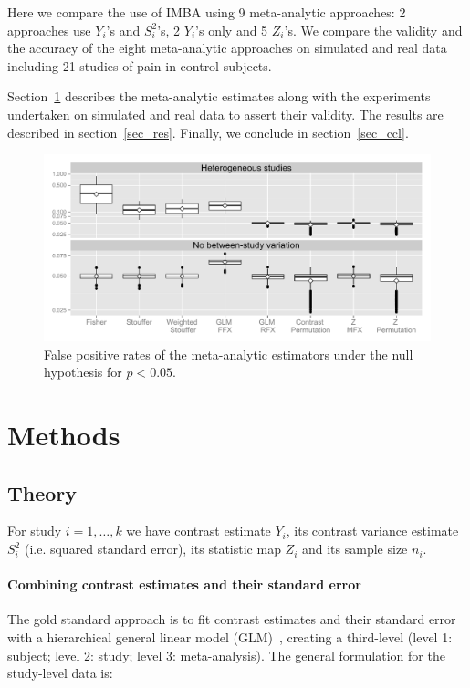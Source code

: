 \documentclass{llncs}
\newcommand{\effectvector}{Y}
\newcommand{\effect}[1][i]{\effectvector_{#1}}
\newcommand{\vareffect}[1][i]{S^2_{#1}}
\newcommand{\zeffect}[1][i]{Z_{#1}}
\begin{document}
Here we compare the use of IMBA using 9 meta-analytic approaches: 2 approaches use $\effect$'s and $\vareffect$'s, 2 $\effect$'s only and 5 $\zeffect$'s. We compare the validity and the accuracy of the eight meta-analytic approaches on simulated and real data including 21 studies of pain in control subjects.

Section~\ref{sec_meth} describes the meta-analytic estimates along with the experiments undertaken on simulated and real data to assert their validity. The results are described in section~\ref{sec_res}. Finally, we conclude in section~\ref{sec_ccl}.

\begin{figure}[t]
	\centering
	\includegraphics[width=\linewidth]{./Rplot_FPR_all.pdf}
	\caption{False positive rates of the meta-analytic estimators under the null hypothesis for $p<0.05$.}
	\label{fig_fpr_all}
\end{figure}

\section{Methods}\label{sec_meth}
\subsection{Theory}
For study $i=1,\ldots,k$ we have contrast estimate $\effect$, its contrast variance estimate $S^2_i$ (i.e. squared standard error), its statistic map $Z_i$ and its sample size $n_i$.  

\paragraph{Combining contrast estimates and their standard error}

The gold standard approach is to fit contrast estimates and their standard error with a hierarchical general linear model (GLM)~\cite{Cummings2004}, creating a third-level (level 1: subject; level 2: study; level 3: meta-analysis). The general formulation for the study-level data is:
\end{document}

